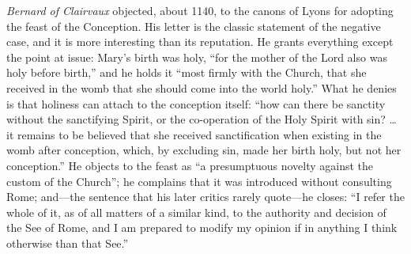 \emph{Bernard of Clairvaux} objected, about 1140, to the canons of Lyons
for adopting the feast of the Conception. His letter is the classic
statement of the negative case, and it is more interesting than its
reputation. He grants everything except the point at issue: Mary's birth
was holy, ``for the mother of the Lord also was holy before birth,'' and
he holds it ``most firmly with the Church, that she received in the womb
that she should come into the world holy.'' What he denies is that
holiness can attach to the conception itself: ``how can there be sanctity
without the sanctifying Spirit, or the co-operation of the Holy Spirit
with sin? \ldots{} it remains to be believed that she received
sanctification when existing in the womb after conception, which, by
excluding sin, made her birth holy, but not her conception.'' He objects
to the feast as ``a presumptuous novelty against the custom of the
Church''; he complains that it was introduced without consulting Rome;
and---the sentence that his later critics rarely quote---he closes: ``I
refer the whole of it, as of all matters of a similar kind, to the
authority and decision of the See of Rome, and I am prepared to modify my
opinion if in anything I think otherwise than that See.''


